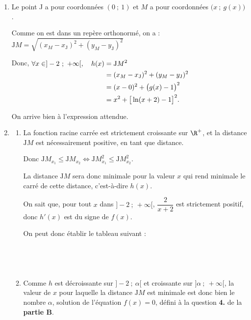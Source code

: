 \begin{enumerate}
\item Le point J a pour coordonnées $(0~;~1)$ et $M$ a pour coordonnées $\big(x~;~g(x)\big)$.

Comme on est dans un repère orthonormé, on a :\quad $\mathrm{J}M = \sqrt{(x_M - x_\mathrm{J})^2 + (y_M - y_\mathrm{J})^2}$

Donc, \quad $\aligned[t] \forall x \in ]-2~;~+\infty[,\quad h(x)&=\mathrm{J}M^2\\
	&=(x_{M} - x_{\mathrm{J}})^2 + (y_{M} - y_{\mathrm{J}})^2\\
	&=(x - 0)^2 + \big(g(x) - 1\big)^2\\
	&=x^{2}+\big[\ln (x+2)-1\big]^{2}.\endaligned$

On arrive bien à l'expression attendue.

\item \begin{enumerate}
	\item La fonction racine carrée est strictement croissante sur $\R^+$, et la distance $\mathrm{J}M$ est nécessairement positive, en tant que distance.

Donc $\mathrm{J}M_{x_1} \leqslant \mathrm{J}M_{x_2} \iff \mathrm{J}M_{x_1}^2 \leqslant \mathrm{J}M_{x_2}^2$.

La distance $\mathrm{J}M$ sera donc minimale pour la valeur $x$ qui rend minimale le carré de cette distance, c'est-à-dire $h(x)$.
	
On sait que, pour tout $x$ dans $]-2~;~+\infty[$, $\dfrac{2}{x+2}$ est strictement positif, donc $h'(x)$ est du signe de $f(x)$.

On peut donc établir le tableau suivant :

	\hfill~\hfill~

	\item Comme $h$ est décroissante sur $]-2~;~\alpha[$ et croissante sur $]\alpha~;~+\infty[$, la valeur de $x$ pour laquelle la distance $\mathrm{J}M$ est minimale est donc bien le nombre $\alpha$, solution de l'équation $f(x) = 0$, défini à la question \textbf{4.} de la \textbf{partie B}.
\end{enumerate}


\end{enumerate}
